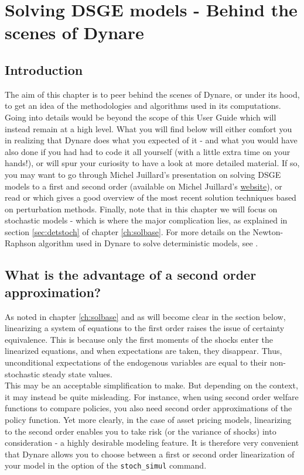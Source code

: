\chapter{Solving DSGE models - Behind the scenes of Dynare} \label{ch:solbeh}

\section{Introduction}
The aim of this chapter is to peer behind the scenes of Dynare, or under its hood, to get an idea of the methodologies and algorithms used in its computations. Going into details would be beyond the scope of this User Guide which will instead remain at a high level. What you will find below will either comfort you in realizing that Dynare does what you expected of it - and what you would have also done if you had had to code it all yourself (with a little extra time on your hands!), or will spur your curiosity to have a look at more detailed material. If so, you may want to go through Michel Juillard's presentation on solving DSGE models to a first and second order (available on Michel Juillard's \href{http://jourdan.ens.fr/~michel/}{website}), or read \citet{CollardJuillard2001b} or \citet{SchmittGrohe2004} which gives a good overview of the most recent solution techniques based on perturbation methods. Finally, note that in this chapter we will focus on stochastic models - which is where the major complication lies, as explained in section \ref{sec:detstoch} of chapter \ref{ch:solbase}. For more details on the Newton-Raphson algorithm used in Dynare to solve deterministic models, see \citet{Juillard1996}. \\

\section{What is the advantage of a second order approximation?}
As noted in chapter \ref{ch:solbase} and as will become clear in the section below, linearizing a system of equations to the first order raises the issue of certainty equivalence. This is because only the first moments of the shocks enter the linearized equations, and when expectations are taken, they disappear. Thus, unconditional expectations of the endogenous variables are equal to their non-stochastic steady state values. \\

This may be an acceptable simplification to make. But depending on the context, it may instead be quite misleading. For instance, when using second order welfare functions to compare policies, you also need second order approximations of the policy function. Yet more clearly, in the case of asset pricing models, linearizing to the second order enables you to take risk (or the variance of shocks) into consideration - a highly desirable modeling feature. It is therefore very convenient that Dynare allows you to choose between a first or second order linearization of your model in the option of the \texttt{stoch\_simul} command. \\


